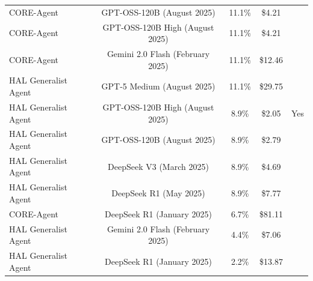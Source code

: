 \begin{tabular}{lcccc}
CORE-Agent & GPT-OSS-120B (August 2025) & 11.1\% & \$4.21 &  \\
CORE-Agent & GPT-OSS-120B High (August 2025) & 11.1\% & \$4.21 &  \\
CORE-Agent & Gemini 2.0 Flash (February 2025) & 11.1\% & \$12.46 &  \\
HAL Generalist Agent & GPT-5 Medium (August 2025) & 11.1\% & \$29.75 &  \\
HAL Generalist Agent & GPT-OSS-120B High (August 2025) & 8.9\% & \$2.05 & Yes \\
HAL Generalist Agent & GPT-OSS-120B (August 2025) & 8.9\% & \$2.79 &  \\
HAL Generalist Agent & DeepSeek V3 (March 2025) & 8.9\% & \$4.69 &  \\
HAL Generalist Agent & DeepSeek R1 (May 2025) & 8.9\% & \$7.77 &  \\
CORE-Agent & DeepSeek R1 (January 2025) & 6.7\% & \$81.11 &  \\
HAL Generalist Agent & Gemini 2.0 Flash (February 2025) & 4.4\% & \$7.06 &  \\
HAL Generalist Agent & DeepSeek R1 (January 2025) & 2.2\% & \$13.87 &  \\
\bottomrule
\end{tabular}